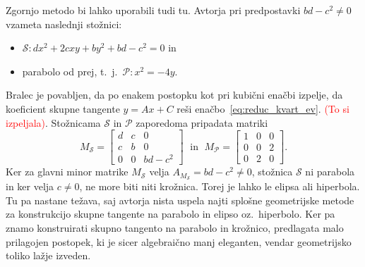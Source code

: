 Zgornjo metodo bi lahko uporabili tudi tu. Avtorja pri predpostavki $bd - c^2 \neq 0$ vzameta naslednji stožnici:
\begin{itemize}
    \item $\mathcal{S}: dx^2 + 2cxy + by^2 + bd - c^2 = 0$ in
    \item parabolo od prej, t.\ j.\ $\mathcal{P}: x^2 = -4y$.
\end{itemize}
Bralec je povabljen, da po enakem postopku kot pri kubični enačbi izpelje, da koeficient skupne tangente $y = Ax + C$ reši enačbo~\ref{eq:reduc_kvart_ev}. \textcolor{red}{(To si izpeljala)}. Stožnicama $\mathcal{S}$ in $\mathcal{P}$ zaporedoma pripadata matriki
$$ M_\mathcal{S} =
    \begin{bmatrix}
        d & c & 0\\
        c & b & 0\\
        0 & 0 & bd - c^2
    \end{bmatrix}
    \; \text{ in } \; M_\mathcal{P} =
    \begin{bmatrix}
        1 & 0 & 0\\
        0 & 0 & 2\\
        0 & 2 & 0
    \end{bmatrix}.
$$
Ker za glavni minor matrike $M_\mathcal{S}$ velja $A_{M_\mathcal{S}} = bd - c^2 \neq 0$, stožnica $\mathcal{S}$ ni parabola in ker velja $c \neq 0$, ne more biti niti krožnica. Torej je lahko le elipsa ali hiperbola. Tu pa nastane težava, saj avtorja nista uspela najti splošne geometrijske metode za konstrukcijo skupne tangente na parabolo in elipso oz.\ hiperbolo. Ker pa znamo konstruirati skupno tangento na parabolo in krožnico, predlagata malo prilagojen postopek, ki je sicer algebraično manj eleganten, vendar geometrijsko toliko lažje izveden.

